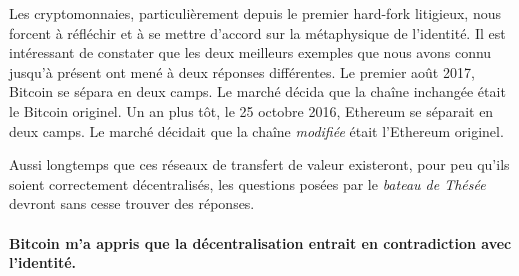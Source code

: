 Les cryptomonnaies, particulièrement depuis le premier hard-fork litigieux, nous
forcent à réfléchir et à se mettre d'accord sur la métaphysique de l'identité.
Il est intéressant de constater que les deux meilleurs exemples que nous avons
connu jusqu'à présent ont mené à deux réponses différentes. Le premier août
2017, Bitcoin se sépara en deux camps. Le marché décida que la chaîne inchangée
était le Bitcoin originel. Un an plus tôt, le 25 octobre 2016, Ethereum se
séparait en deux camps. Le marché décidait que la chaîne \textit{modifiée} était
l'Ethereum originel.

Aussi longtemps que ces réseaux de transfert de valeur existeront, pour peu
qu'ils soient correctement décentralisés, les questions posées par le
\textit{bateau de Thésée} devront sans cesse trouver des réponses.

\paragraph{Bitcoin m'a appris que la décentralisation entrait en contradiction
avec l'identité.}

%
%
%
%
